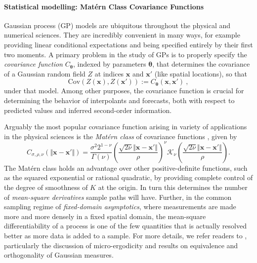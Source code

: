 \documentclass{article}
\begin{document}
\paragraph{Statistical modelling: Mat\'ern Class Covariance Functions} 

Gaussian process (GP) models are ubiquitous throughout the physical and
numerical sciences. They are incredibly convenient in many ways, for example
providing linear conditional expectations and being specified entirely by their
first two moments. A primary problem in the study of GPs is to properly specify
the \emph{covariance function} $C_{\bm{\theta}}$, indexed by parameters
$\bm{\theta}$, that determines the covariance of a Gaussian random field $Z$ at
indices $\bm{x}$ and $\bm{x}'$ (like spatial locations), so that
\begin{equation*} %
  \text{Cov}(Z(\bm{x}), Z(\bm{x}')) := C_{\bm{\theta}}(\bm{x}, \bm{x}')\ ,
\end{equation*}
under that model.  Among other purposes, the covariance function is crucial for determining the
behavior of interpolants and forecasts, both with respect to predicted values
and inferred second-order information.

Arguably the most popular covariance function arising in 
variety of applications in the physical sciences is the \emph{Mat\'ern class} of
covariance functions \citep{matern1960}, given by
\begin{equation} \label{eq:matern}
  C_{\sigma, \rho, \nu}(\Vert \bm{x} - \bm{x}'\Vert) 
  = 
  \frac{\sigma^2 2^{1-\nu}}{\Gamma(\nu)}
  \left(\frac{ \sqrt{2 \nu} \Vert \bm{x} - \bm{x}'\Vert}{\rho} \right)^{\nu}
  \mathcal{K}_{\nu} \left(
  \frac{ \sqrt{2 \nu} \Vert \bm{x} - \bm{x}'\Vert}{\rho} 
  \right).
\end{equation}
The Mat\'ern class holds an advantage over
other positive-definite functions, such as the squared exponential
or rational quadratic, by providing complete control of the
degree of smoothness of $K$ at the origin. In turn this determines the number
of \emph{mean-square derivatives} sample paths will have. Further, in the
common sampling regime of \emph{fixed-domain asymptotics}, where measurements
are made more and more densely in a fixed spatial domain, the mean-square
differentiability of a process is one of the few quantities that is actually
resolved better as more data is added to a sample. For more details, we refer
readers to \cite{stein1999}, particularly the discussion of micro-ergodicity and
results on equivalence and orthogonality of Gaussian measures.
\end{document}

